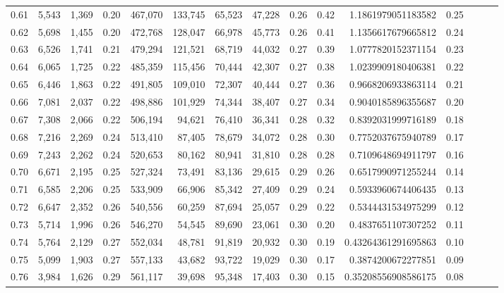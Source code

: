 \begin{tabular}{rrrrrrrrrrrrrrr}
0.61 &   5,543 &  1,369 &  0.20 &  467,070 &  133,745 &   65,523 &   47,228 &  0.26 &  0.42 &    1.1861979051183582 &      0.25 \\
0.62 &   5,698 &  1,455 &  0.20 &  472,768 &  128,047 &   66,978 &   45,773 &  0.26 &  0.41 &    1.1356617679665812 &      0.24 \\
0.63 &   6,526 &  1,741 &  0.21 &  479,294 &  121,521 &   68,719 &   44,032 &  0.27 &  0.39 &    1.0777820152371154 &      0.23 \\
0.64 &   6,065 &  1,725 &  0.22 &  485,359 &  115,456 &   70,444 &   42,307 &  0.27 &  0.38 &    1.0239909180406381 &      0.22 \\
0.65 &   6,446 &  1,863 &  0.22 &  491,805 &  109,010 &   72,307 &   40,444 &  0.27 &  0.36 &    0.9668206933863114 &      0.21 \\
0.66 &   7,081 &  2,037 &  0.22 &  498,886 &  101,929 &   74,344 &   38,407 &  0.27 &  0.34 &    0.9040185896355687 &      0.20 \\
0.67 &   7,308 &  2,066 &  0.22 &  506,194 &   94,621 &   76,410 &   36,341 &  0.28 &  0.32 &    0.8392031999716189 &      0.18 \\
0.68 &   7,216 &  2,269 &  0.24 &  513,410 &   87,405 &   78,679 &   34,072 &  0.28 &  0.30 &    0.7752037675940789 &      0.17 \\
0.69 &   7,243 &  2,262 &  0.24 &  520,653 &   80,162 &   80,941 &   31,810 &  0.28 &  0.28 &    0.7109648694911797 &      0.16 \\
0.70 &   6,671 &  2,195 &  0.25 &  527,324 &   73,491 &   83,136 &   29,615 &  0.29 &  0.26 &    0.6517990971255244 &      0.14 \\
0.71 &   6,585 &  2,206 &  0.25 &  533,909 &   66,906 &   85,342 &   27,409 &  0.29 &  0.24 &    0.5933960674406435 &      0.13 \\
0.72 &   6,647 &  2,352 &  0.26 &  540,556 &   60,259 &   87,694 &   25,057 &  0.29 &  0.22 &    0.5344431534975299 &      0.12 \\
0.73 &   5,714 &  1,996 &  0.26 &  546,270 &   54,545 &   89,690 &   23,061 &  0.30 &  0.20 &    0.4837651107307252 &      0.11 \\
0.74 &   5,764 &  2,129 &  0.27 &  552,034 &   48,781 &   91,819 &   20,932 &  0.30 &  0.19 &   0.43264361291695863 &      0.10 \\
0.75 &   5,099 &  1,903 &  0.27 &  557,133 &   43,682 &   93,722 &   19,029 &  0.30 &  0.17 &    0.3874200672277851 &      0.09 \\
0.76 &   3,984 &  1,626 &  0.29 &  561,117 &   39,698 &   95,348 &   17,403 &  0.30 &  0.15 &   0.35208556908586175 &      0.08 \\

\end{tabular}
